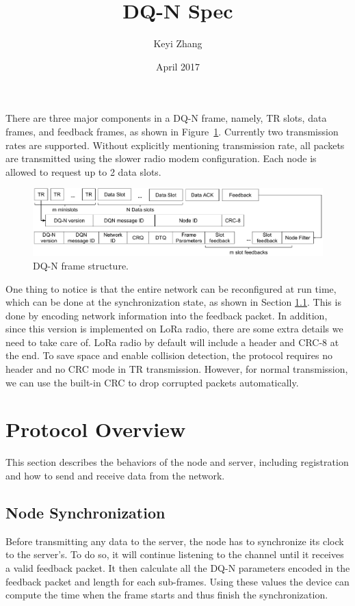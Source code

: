 \documentclass{article}
\title{DQ-N Spec}
\author{Keyi Zhang}
\date{April 2017}
\begin{document}
There are three major components in a DQ-N frame, namely, TR slots, data frames, and feedback frames, as shown in Figure~\ref{fig:improved-frame}. Currently two transmission rates are supported. Without explicitly mentioning transmission rate, all packets are transmitted using the slower radio modem configuration. Each node is allowed to request up to 2 data slots.

\begin{figure}[htb]
 \centering 
 \includegraphics[width=1\linewidth]{improved-frame.pdf}
 \caption{DQ-N frame structure.}
\label{fig:improved-frame}
\end{figure}

One thing to notice is that the entire network can be reconfigured at run time, which can be done at the synchronization state, as shown in Section \ref{app:sec:sync}. This is done by encoding network information into the feedback packet. In addition, since this version is implemented on LoRa radio, there are some extra details we need to take care of. LoRa radio by default will include a header and CRC-8 at the end. To save space and enable collision detection, the protocol requires no header and no CRC mode in TR transmission. However, for normal transmission, we can use the built-in CRC to drop corrupted packets automatically.

\section{Protocol Overview}
This section describes the behaviors of the node and server, including registration and how to send and receive data from the network.

\subsection{Node Synchronization}
\label{app:sec:sync}
Before transmitting any data to the server, the node has to synchronize its clock to the server's. To do so, it will continue listening to the channel until it receives a valid feedback packet. It then calculate all the DQ-N parameters encoded in the feedback packet and length for each sub-frames. Using these values the device can compute the time when the frame starts and thus finish the synchronization.
\end{document}
